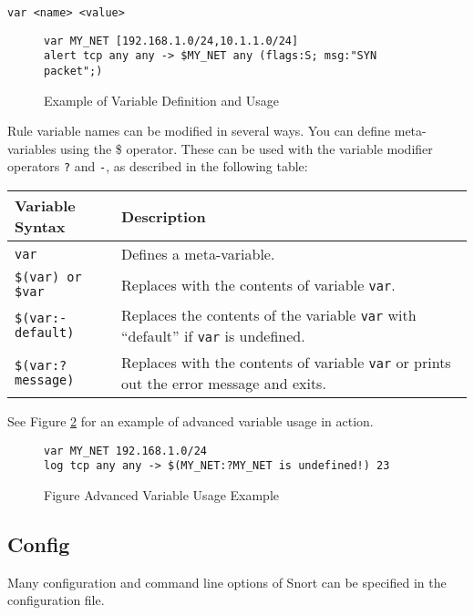 \documentclass[english]{report}
\begin{document}
\begin{verbatim}
var <name> <value>
\end{verbatim}

\begin{figure}[!hbpt]
\begin{verbatim}
var MY_NET [192.168.1.0/24,10.1.1.0/24]
alert tcp any any -> $MY_NET any (flags:S; msg:"SYN packet";)
\end{verbatim}

\caption{Example of Variable Definition and Usage\label{variable definition}}
\end{figure}

Rule variable names can be modified in several ways. You can define
meta-variables using the \$ operator. These can be used with the variable
modifier operators {\tt ?}  and {\tt -}, as described in the following table: 

\begin{tabular}{| l | p{5in} |}
\hline
\textbf{Variable Syntax} & \textbf{Description}\\
\hline
\hline
\texttt{var} & Defines a meta-variable.\\
\hline
\texttt{\$(var) or \$var} & Replaces with the contents of variable \texttt{var}.\\
\hline
\texttt{\$(var:-default)} & Replaces the contents of the variable \texttt{var} with ``default'' if 
   \texttt{var} is undefined.\\
\hline
\texttt{\$(var:?message)} & Replaces with the contents of variable \texttt{var} or prints out the
error message and exits.\\
\hline
\end{tabular}


See Figure \ref{advanced variable usage} for an example of advanced variable usage in action.

\begin{figure}[!hbpt]
\begin{verbatim}
var MY_NET 192.168.1.0/24
log tcp any any -> $(MY_NET:?MY_NET is undefined!) 23
\end{verbatim}

\caption{Figure Advanced Variable Usage Example\label{advanced variable usage}}
\end{figure}

\subsection{Config}

Many configuration and command line options of Snort can be specified
in the configuration file. 
\end{document}
